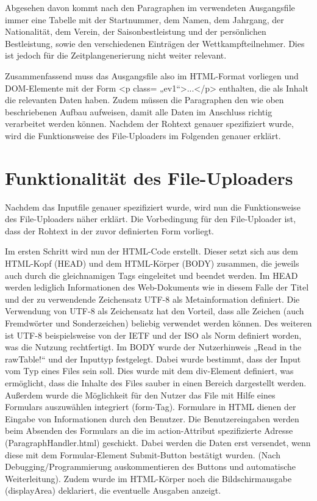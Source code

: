Abgesehen davon kommt nach den Paragraphen im verwendeten Ausgangsfile immer eine Tabelle mit der Startnummer, dem Namen, dem Jahrgang, der Nationalität, dem Verein, der Saisonbestleistung und der persönlichen Bestleistung, sowie den verschiedenen Einträgen der Wettkampfteilnehmer. Dies ist jedoch für die Zeitplangenerierung nicht weiter relevant.

Zusammenfassend muss das Ausgangsfile also im HTML-Format vorliegen und DOM-Elemente mit der Form <p class= „ev1“>...</p> enthalten, die als Inhalt die relevanten Daten haben. Zudem müssen die Paragraphen den wie oben beschriebenen Aufbau aufweisen, damit alle Daten im Anschluss richtig verarbeitet werden können. 
Nachdem der Rohtext genauer spezifiziert wurde, wird die Funktionsweise des File-Uploaders im Folgenden genauer erklärt.

\section{Funktionalität des File-Uploaders}
Nachdem das Inputfile genauer spezifiziert wurde, wird nun die Funktionsweise des File-Uploaders näher erklärt. Die Vorbedingung für den File-Uploader ist, dass der Rohtext in der zuvor definierten Form vorliegt.

 Im ersten Schritt wird nun der HTML-Code erstellt. Dieser setzt sich aus dem HTML-Kopf (HEAD) und dem HTML-Körper (BODY) zusammen, die jeweils auch durch die gleichnamigen Tags eingeleitet und beendet werden. Im HEAD werden lediglich Informationen des Web-Dokuments wie in diesem Falle der Titel und der zu verwendende Zeichensatz \ac{UTF-8} als Metainformation definiert. Die Verwendung von UTF-8 als Zeichensatz hat den Vorteil, dass alle Zeichen (auch Fremdwörter und Sonderzeichen) beliebig verwendet werden können. Des weiteren ist UTF-8 beispielsweise von der \ac{IETF} und der \ac{ISO} als Norm definiert worden, was die Nutzung rechtfertigt.  Im BODY wurde der Nutzerhinweis „Read in the rawTable!“  und der Inputtyp festgelegt. Dabei wurde bestimmt, dass der Input vom Typ eines Files sein soll. Dies wurde mit dem div-Element definiert, was ermöglicht, dass die Inhalte des Files sauber in einen Bereich dargestellt werden. Außerdem wurde die Möglichkeit für den Nutzer das File mit Hilfe eines Formulars auszuwählen integriert (form-Tag). Formulare in HTML dienen der Eingabe von Informationen durch den Benutzer. Die Benutzereingaben werden beim Absenden des Formulars an die im action-Attribut spezifizierte Adresse (ParagraphHandler.html) geschickt. Dabei werden die Daten erst versendet, wenn diese mit dem Formular-Element Submit-Button bestätigt wurden. (Nach Debugging/Programmierung auskommentieren des Buttons und automatische Weiterleitung). Zudem wurde im HTML-Körper noch die Bildschirmausgabe (displayArea) deklariert, die eventuelle Ausgaben anzeigt. 

